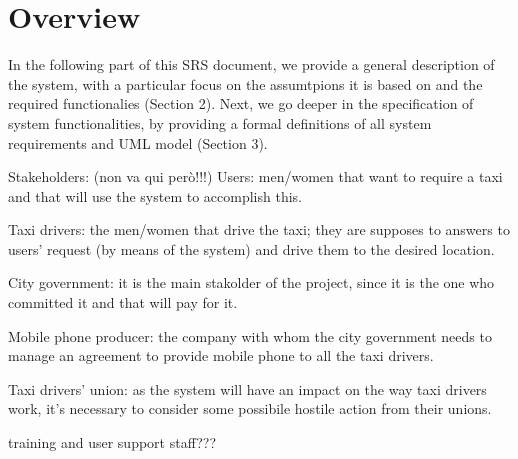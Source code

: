 \section{Overview}
In the following part of this SRS document, we provide a general description of the system, with a particular focus on the assumtpions it is based on and the required functionalies (Section 2). Next, we go deeper in the specification of system functionalities, by providing a formal definitions of all system requirements and UML model (Section 3).

Stakeholders: (non va qui però!!!)
Users: men/women that want to require a taxi and that will use the system to accomplish this.

Taxi drivers: the men/women that drive the taxi; they are supposes to answers to users' request (by means of the system) and drive them to the desired location.

City government: it is the main stakolder of the project, since it is the one who committed it and that will pay for it.

Mobile phone producer: the company with whom the city government needs to manage an agreement  to provide mobile phone to all the taxi drivers.

Taxi drivers’ union: as the system will have an impact on the way taxi drivers work, it's necessary to consider some possibile hostile action from their unions.

training and user support staff???